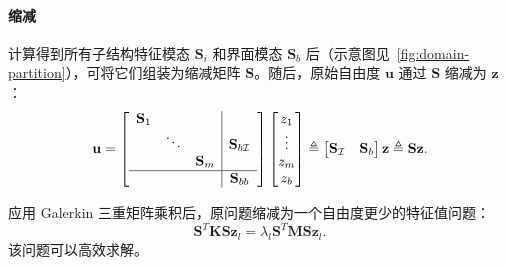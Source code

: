 \paragraph{缩减}
\label{sec:reducing}
计算得到所有子结构特征模态 $\mathbf{S}_i$ 和界面模态 $\mathbf{S}_b$ 后（示意图见~\cref{fig:domain-partition}），可将它们组装为缩减矩阵 $\mathbf{S}$。随后，原始自由度 $\mathbf{u}$ 通过 $\mathbf{S}$ 缩减为 $\mathbf{z}$：
\begin{equation}
  \mathbf{u} =
  \left[
    \begin{array}{ccc|c}
  \mathbf{S}_1 &&&\\
      &\ddots && \mathbf{S}_{b\mathcal{I}}\\
      &&\mathbf{S}_m &\\\hline
      &&&\mathbf{S}_{bb}
    \end{array}
  \right]
  \begin{bmatrix}
  z_1 \\\vdots\\ z_m\\z_b
  \end{bmatrix}
  \triangleq
  \begin{bmatrix}
    \mathbf{S}_{\mathcal{I}} & \mathbf{S}_{b}
  \end{bmatrix}\mathbf{z}
  \triangleq \mathbf{S} \mathbf{z}.
  \label{eq:redmat}
\end{equation}

应用 Galerkin 三重矩阵乘积后，原问题缩减为一个自由度更少的特征值问题：
\begin{equation}
  \mathbf{S}^T\mathbf{K} \mathbf{S} \mathbf{z}_l =\lambda_l \mathbf{S}^T \mathbf{M} \mathbf{S} \mathbf{z}_l.
  \label{eq:reduced-matrix-pencil}
\end{equation}
该问题可以高效求解。


